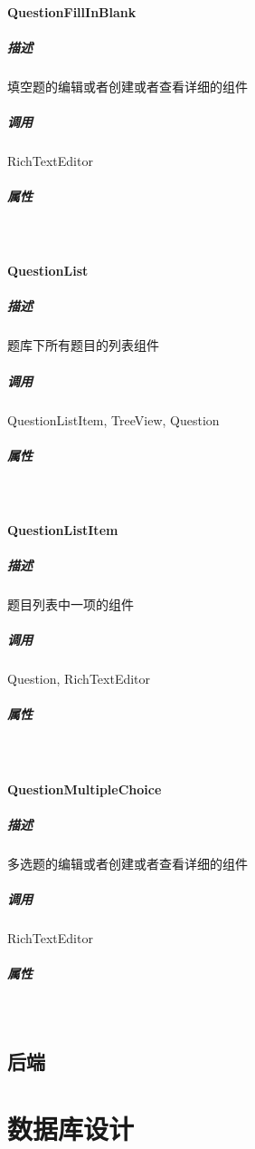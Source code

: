 \documentclass{article}
\begin{document}
	    \paragraph{QuestionFillInBlank}
	    	\subparagraph{描述}
	    		填空题的编辑或者创建或者查看详细的组件
	    	\subparagraph{调用}
	    		RichTextEditor
	    	\subparagraph{属性}\ \par
	    \paragraph{QuestionList}
	    	\subparagraph{描述}
	    		题库下所有题目的列表组件
	    	\subparagraph{调用}
	    		QuestionListItem, TreeView, Question
	    	\subparagraph{属性}\ \par
	   	\paragraph{QuestionListItem}
	   		\subparagraph{描述}
	   			题目列表中一项的组件
	   		\subparagraph{调用}
	   			Question, RichTextEditor
	   		\subparagraph{属性}\ \par
	   	\paragraph{QuestionMultipleChoice}
		   	\subparagraph{描述}
		   		多选题的编辑或者创建或者查看详细的组件
		   	\subparagraph{调用}
		   		RichTextEditor
		   	\subparagraph{属性}\ \par
    \subsection{后端}
    
\section{数据库设计}
\end{document}
